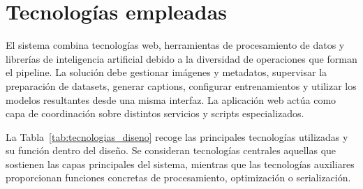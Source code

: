 \documentclass[a4paper,11pt,titlepage]{scrbook}
\newcommand{\estilotabla}{%
    \small
    \setlength{\tabcolsep}{4pt}
    \renewcommand{\arraystretch}{1.15}
}
\begin{document}
\section{Tecnologías empleadas}
\label{sec:tecnologias_empleadas}

El sistema combina tecnologías web, herramientas de procesamiento de datos y librerías de inteligencia artificial debido a la diversidad de operaciones que forman el pipeline. La solución debe gestionar imágenes y metadatos, supervisar la preparación de datasets, generar captions, configurar entrenamientos y utilizar los modelos resultantes desde una misma interfaz. La aplicación web actúa como capa de coordinación sobre distintos servicios y scripts especializados.

\medskip

La Tabla~\ref{tab:tecnologias_diseno} recoge las principales tecnologías utilizadas y su función dentro del diseño. Se consideran tecnologías centrales aquellas que sostienen las capas principales del sistema, mientras que las tecnologías auxiliares proporcionan funciones concretas de procesamiento, optimización o serialización.
\begingroup
\estilotabla
\end{document}
